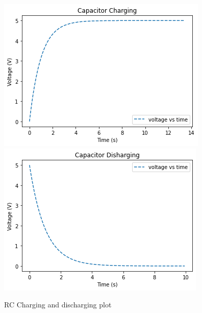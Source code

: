         \begin{figure}
            \centering
            \includegraphics[scale=0.5]{images/rc_charging_plot.png}
            \includegraphics[scale=0.5]{images/rc_discharging_plot.png}
            \caption{RC Charging and discharging plot}
        \end{figure}

